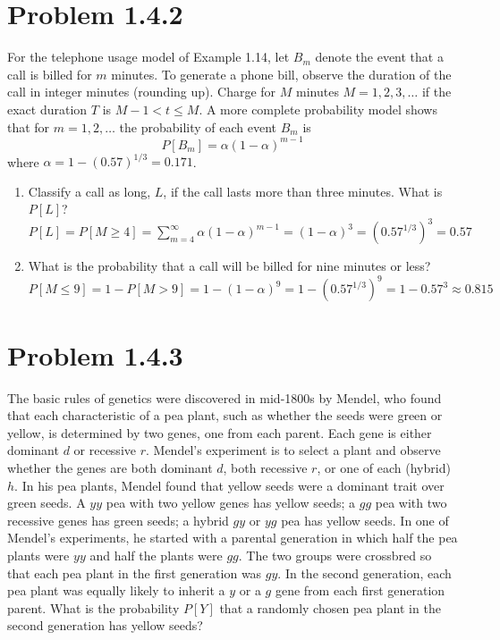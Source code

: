 \documentclass{article}
\begin{document}
\newpage

\section*{Problem 1.4.2}
For the telephone usage model of Example 1.14, let $B_m$ denote the event that a call is billed for $m$ minutes. To generate a phone bill, observe the duration of the call in integer minutes (rounding up). Charge for $M$ minutes $M = 1, 2, 3, \dots$ if the exact duration $T$ is $M - 1 < t \le M$. A more complete probability model shows that for $m = 1, 2, \dots$ the probability of each event $B_m$ is
\[ P[B_m] = \alpha(1 - \alpha)^{m-1} \]
where $\alpha = 1 - (0.57)^{1/3} = 0.171$.

\begin{enumerate}[label=(\alph*)]
    \item Classify a call as long, $L$, if the call lasts more than three minutes. What is $P[L]$? \\[1em]
    {\boldmath\textbf{$P[L] = P[M \ge 4] = \sum_{m=4}^\infty \alpha(1-\alpha)^{m-1} = (1-\alpha)^3 = (0.57^{1/3})^3 = 0.57$}}
    
    \item What is the probability that a call will be billed for nine minutes or less? \\[1em]
    {\boldmath\textbf{$P[M \le 9] = 1 - P[M > 9] = 1 - (1-\alpha)^9 = 1 - (0.57^{1/3})^9 = 1 - 0.57^3 \approx 0.815$}}
\end{enumerate}

\newpage

\section*{Problem 1.4.3}
The basic rules of genetics were discovered in mid-1800s by Mendel, who found that each characteristic of a pea plant, such as whether the seeds were green or yellow, is determined by two genes, one from each parent. Each gene is either dominant $d$ or recessive $r$. Mendel's experiment is to select a plant and observe whether the genes are both dominant $d$, both recessive $r$, or one of each (hybrid) $h$. In his pea plants, Mendel found that yellow seeds were a dominant trait over green seeds. A $yy$ pea with two yellow genes has yellow seeds; a $gg$ pea with two recessive genes has green seeds; a hybrid $gy$ or $yg$ pea has yellow seeds. In one of Mendel's experiments, he started with a parental generation in which half the pea plants were $yy$ and half the plants were $gg$. The two groups were crossbred so that each pea plant in the first generation was $gy$. In the second generation, each pea plant was equally likely to inherit a $y$ or a $g$ gene from each first generation parent. What is the probability $P[Y]$ that a randomly chosen pea plant in the second generation has yellow seeds?
\end{document}
